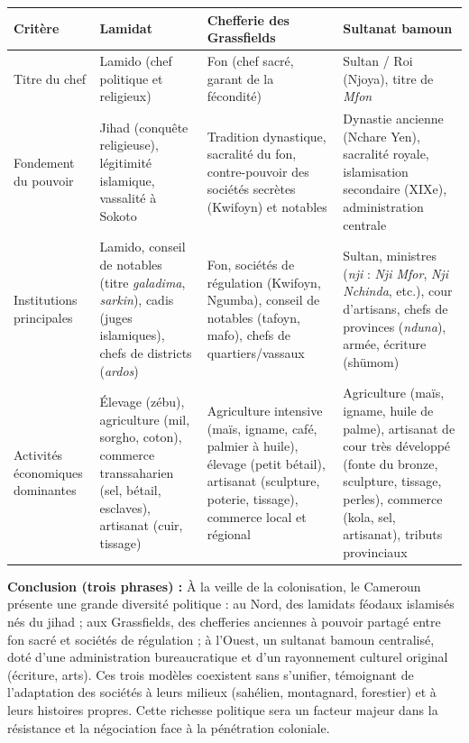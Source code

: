 \documentclass[11pt]{article}
\newcommand{\cle}[1]{{\popxbold\color{popdark}#1}}
\begin{document}
\begin{corrige}
\begin{center}
\begin{tabularx}{\linewidth}{|l|X|X|X|}
\hline
\rowcolor{popblueL} \textbf{Critère} & \textbf{Lamidat} & \textbf{Chefferie des Grassfields} & \textbf{Sultanat bamoun} \\
\hline
Titre du chef & \cle{Lamido} (chef politique et religieux) & \cle{Fon} (chef sacré, garant de la fécondité) & \cle{Sultan} / Roi (Njoya), titre de \emph{Mfon} \\
\hline
Fondement du pouvoir & Jihad (conquête religieuse), légitimité islamique, vassalité à Sokoto & Tradition dynastique, sacralité du fon, contre-pouvoir des sociétés secrètes (Kwifoyn) et notables & Dynastie ancienne (Nchare Yen), sacralité royale, islamisation secondaire (XIXe), administration centrale \\
\hline
Institutions principales & Lamido, conseil de notables (titre \emph{galadima}, \emph{sarkin}), cadis (juges islamiques), chefs de districts (\emph{ardos}) & Fon, sociétés de régulation (Kwifoyn, Ngumba), conseil de notables (tafoyn, mafo), chefs de quartiers/vassaux & Sultan, ministres (\emph{nji} : \emph{Nji Mfor}, \emph{Nji Nchinda}, etc.), cour d'artisans, chefs de provinces (\emph{nduna}), armée, écriture (shümom) \\
\hline
Activités économiques dominantes & Élevage (zébu), agriculture (mil, sorgho, coton), commerce transsaharien (sel, bétail, esclaves), artisanat (cuir, tissage) & Agriculture intensive (maïs, igname, café, palmier à huile), élevage (petit bétail), artisanat (sculpture, poterie, tissage), commerce local et régional & Agriculture (maïs, igname, huile de palme), artisanat de cour très développé (fonte du bronze, sculpture, tissage, perles), commerce (kola, sel, artisanat), tributs provinciaux \\
\hline
\end{tabularx}
\end{center}

\textbf{Conclusion (trois phrases) :}
À la veille de la colonisation, le Cameroun présente une grande diversité politique : au Nord, des lamidats féodaux islamisés nés du jihad ; aux Grassfields, des chefferies anciennes à pouvoir partagé entre fon sacré et sociétés de régulation ; à l'Ouest, un sultanat bamoun centralisé, doté d'une administration bureaucratique et d'un rayonnement culturel original (écriture, arts). Ces trois modèles coexistent sans s'unifier, témoignant de l'adaptation des sociétés à leurs milieux (sahélien, montagnard, forestier) et à leurs histoires propres. Cette richesse politique sera un facteur majeur dans la résistance et la négociation face à la pénétration coloniale.
\end{corrige}
\end{document}
